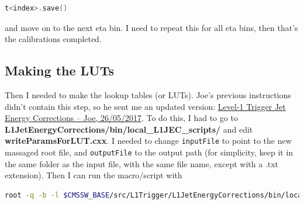 \begin{lstlisting}[belowskip=-0.7cm, language=C++, numbers=none]
t<index>.save()
\end{lstlisting}

and move on to the next eta bin. I need to repeat this for all eta bins, then that's the calibrations completed. 



\subsection{Making the LUTs}

Then I needed to make the lookup tables (or LUTs). Joe's previous instructions didn't contain this step, so he sent me an updated version: \href{run:./sec20/2017_05_26_L1JECinstructions.pdf}{Level-1 Trigger Jet Energy Corrections -- Joe, 26/05/2017}. To do this, I had to go to \textbf{L1JetEnergyCorrections/bin/local\_L1JEC\_scripts/} and edit \textbf{writeParamsForLUT.cxx}. I needed to change \texttt{inputFile} to point to the new massaged root file, and \texttt{outputFile} to the output path (for simplicity, keep it in the same folder as the input file, with the same file name, except with a .txt extension). Then I can run the macro/script with

\begin{lstlisting}[belowskip=-0.7cm, language=sh, numbers=none]
root -q -b -l $CMSSW_BASE/src/L1Trigger/L1JetEnergyCorrections/bin/local_L1JEC_scripts/writeParamsForLUT.cxx
\end{lstlisting}

